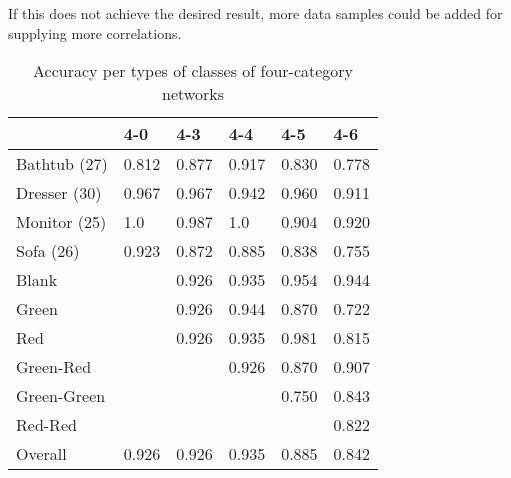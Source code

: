 If this does not achieve the desired result, more data samples could be added for supplying more correlations.
\begin{table}[]
	\centering
	\caption{Accuracy per types of classes of four-category networks}
	\label{tab:four-category-accuracies}
	\begin{tabular}{l|lllll}
		            & 4-0   & 4-3   & 4-4   & 4-5   & 4-6   \\ \hline
		Bathtub (27)& 0.812 & 0.877 & 0.917 & 0.830 & 0.778 \\
		Dresser (30)& 0.967 & 0.967 & 0.942 & 0.960 & 0.911 \\
		Monitor (25)& 1.0   & 0.987 & 1.0   & 0.904 & 0.920 \\
		Sofa (26)   & 0.923 & 0.872 & 0.885 & 0.838 & 0.755 \\ \hline
		Blank       &       & 0.926 & 0.935 & 0.954 & 0.944 \\
		Green       &       & 0.926 & 0.944 & 0.870 & 0.722 \\
		Red         &       & 0.926 & 0.935 & 0.981 & 0.815 \\
		Green-Red   &       &       & 0.926 & 0.870 & 0.907 \\
		Green-Green &       &       &       & 0.750 & 0.843 \\
		Red-Red     &       &       &       &       & 0.822 \\ \hline
		Overall     & 0.926 & 0.926 & 0.935 & 0.885 & 0.842
	\end{tabular}
\end{table}